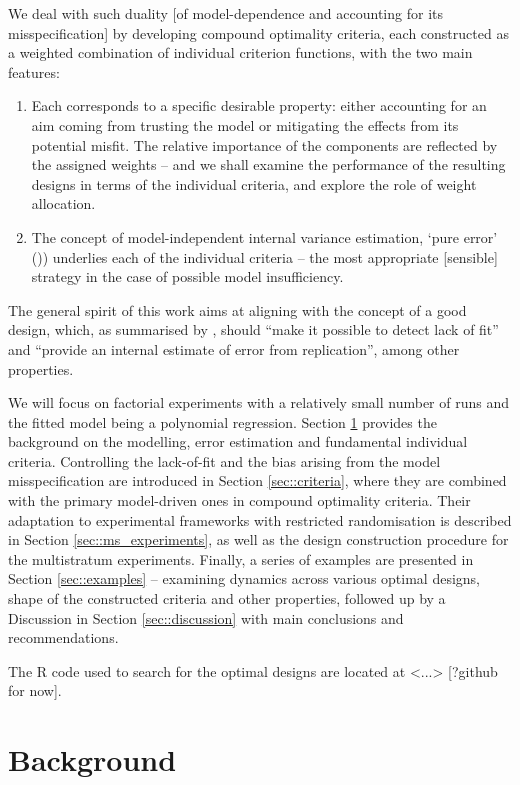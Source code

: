 \documentclass[11pt]{article}
\begin{document}
We deal with such duality [of model-dependence and accounting for its misspecification] by developing compound optimality criteria, each constructed as a weighted combination of individual criterion functions, with the two main features:
\begin{enumerate}
	\item Each corresponds to a specific desirable property:  either accounting for an aim coming from trusting the model or mitigating the effects from its potential misfit. The relative importance of the components are reflected by the assigned weights -- and we shall examine the performance of the resulting designs in terms of the individual criteria, and explore the role of weight allocation.
	\item The concept of model-independent internal variance estimation, `pure error' (\cite{GilmourTrinca2012})) underlies each of the individual criteria -- the most appropriate [sensible] strategy in the case of possible model insufficiency. 
 \end{enumerate}

The general spirit of this work aims at aligning with the concept of a good design, which, as summarised by \cite{Box1987empirical},  should ``make it possible to detect lack of fit'' and ``provide an internal estimate of error from replication'', among other properties. 

We will focus on factorial experiments with a relatively small number of runs and the fitted model being a polynomial regression. Section \ref{sec::background} provides the background on the modelling, error estimation and fundamental individual criteria. Controlling the lack-of-fit and the bias arising from the model misspecification are introduced in Section \ref{sec::criteria}, where they are combined with the primary model-driven ones in compound optimality criteria. Their adaptation to experimental frameworks with restricted randomisation is described in Section \ref{sec::ms_experiments}, as well as the design construction procedure for the multistratum experiments. Finally, a series of examples are presented in Section \ref{sec::examples} -- examining dynamics across various optimal designs,  shape of the constructed criteria and other properties, followed up by a Discussion in Section \ref{sec::discussion} with main conclusions and recommendations. 

The $\mbox{R}$ code used to search for the optimal designs are located at <...> [?github for now].

\section{Background}
\label{sec::background}
\end{document}

